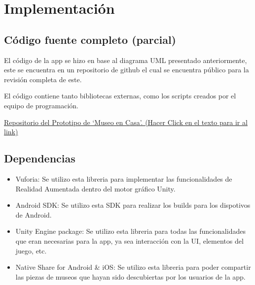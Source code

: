 \section{Implementación}

\subsection{Código fuente completo (parcial)}
El código de la app se hizo en base al diagrama UML presentado anteriormente, este se encuentra en un repositorio de github el cual se encuentra público para la revisión completa de este.

El código contiene tanto bibliotecas externas, como los scripts creados por el equipo de programación. 

\href{https://github.com/pokelocos/Prototipo_Ing_Software/tree/master/repo_ingSoftware}{Repositorio del Prototipo de `Museo en Casa'. (Hacer Click en el texto para ir al link)}



\subsection{Dependencias}

\begin{itemize}

\item Vuforia: Se utilizo esta libreria para implementar las funcionalidades de Realidad Aumentada dentro del motor gráfico Unity.

\item Android SDK: Se utilizo esta SDK para realizar los builds para los dispotivos de Android.

\item Unity Engine package: Se utilizo esta libreria para todas las funcionalidades que eran necesarias para la app, ya sea interacción con la UI, elementos del juego, etc.

\item Native Share for Android & iOS: Se utilizo esta libreria para poder compartir las piezas de museos que hayan sido descubiertas por los usuarios de la app.


\end{itemize}